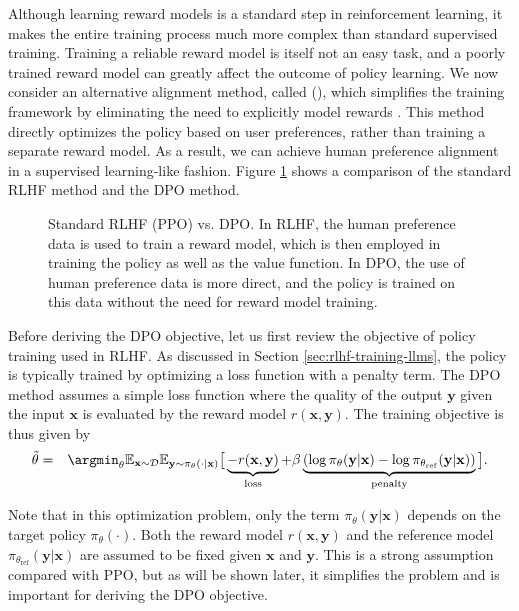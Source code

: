 \noindent Although learning reward models is a standard step in reinforcement learning, it makes the entire training process much more complex than standard supervised training. Training a reliable reward model is itself not an easy task, and a poorly trained reward model can greatly affect the outcome of policy learning. We now consider an alternative alignment method, called  (), which simplifies the training framework by eliminating the need to explicitly model rewards \cite{rafailov-etal:2024direct}. This method directly optimizes the policy based on user preferences, rather than training a separate reward model. As a result, we can achieve human preference alignment in a supervised learning-like fashion. Figure \ref{fig:rlhf-vs-dpo} shows a comparison of the standard RLHF method and the DPO method.

\begin{figure}[!t]
\centering

\caption{Standard RLHF (PPO) vs. DPO. In RLHF, the human preference data is used to train a reward model, which is then employed in training the policy as well as the value function. In DPO, the use of human preference data is more direct, and the policy is trained on this data without the need for reward model training.}
\label{fig:rlhf-vs-dpo}
\end{figure}

Before deriving the DPO objective, let us first review the objective of policy training used in RLHF. As discussed in Section \ref{sec:rlhf-training-llms}, the policy is typically trained by optimizing a loss function with a penalty term. The DPO method assumes a simple loss function where the quality of the output $\mathbf{y}$ given the input $\mathbf{x}$ is evaluated by the reward model $r(\mathbf{x},\mathbf{y})$. The training objective is thus given by
\begin{eqnarray}
\tilde{\theta} & = & \argmin_{\theta} \mathbb{E}_{\mathbf{x} \sim \mathcal{D}} \mathbb{E}_{\mathbf{y} \sim \pi_{\theta}(\cdot|\mathbf{x})} \big[ \underbrace{-r(\mathbf{x},\mathbf{y})}_{\text{loss}} + \beta \underbrace{(\log \pi_{\theta}(\mathbf{y}|\mathbf{x}) - \log \pi_{\theta_{\mathrm{ref}}}(\mathbf{y}|\mathbf{x}) )}_{\text{penalty}} \big]. \label{eq:dpo-basic-objective}
\end{eqnarray}

\noindent Note that in this optimization problem, only the term $\pi_{\theta}(\mathbf{y}|\mathbf{x})$ depends on the target policy $\pi_{\theta}(\cdot)$. Both the reward model $r(\mathbf{x}, \mathbf{y})$ and the reference model $\pi_{\theta_{\mathrm{ref}}}(\mathbf{y}|\mathbf{x})$ are assumed to be fixed given $\mathbf{x}$ and $\mathbf{y}$. This is a strong assumption compared with PPO, but as will be shown later, it simplifies the problem and is important for deriving the DPO objective.

